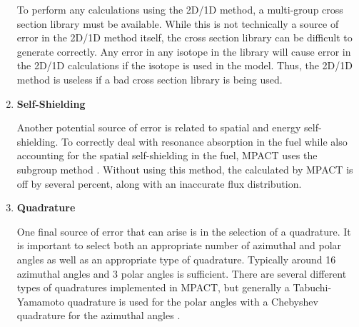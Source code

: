 \begin{enumerate}[leftmargin=*]
  To perform any calculations using the 2D/1D method, a multi-group cross section library must be available.  While this is not technically a source of error in the 2D/1D method itself, the cross section library can be difficult to generate correctly.  Any error in any isotope in the library will cause error in the 2D/1D calculations if the isotope is used in the model.  Thus, the 2D/1D method is useless if a bad cross section library is being used.
  
  \item \textbf{Self-Shielding}
  
  Another potential source of error is related to spatial and energy self-shielding.  To correctly deal with resonance absorption in the fuel while also accounting for the spatial self-shielding in the fuel, MPACT uses the subgroup method \cite{SubgroupOrig1974,SelfShieldingMethodologyMPACT2013}.  Without using this method, the \keff{} calculated by MPACT is off by several percent, along with an inaccurate flux distribution.
  
  \item \textbf{Quadrature}
  
  One final source of error that can arise is in the selection of a quadrature.  It is important to select both an appropriate number of azimuthal and polar angles as well as an appropriate type of quadrature.  Typically around 16 azimuthal angles and 3 polar angles is sufficient.  There are several different types of quadratures implemented in MPACT, but generally a Tabuchi-Yamamoto quadrature is used for the polar angles \cite{YamamotoQuadrature2012} with a Chebyshev quadrature for the azimuthal angles \cite{HandbookOfMathFunctions1972}.
\end{enumerate}